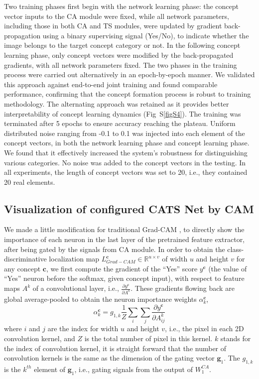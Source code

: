 \documentclass[pdflatex,sn-mathphys-num,lineno]{sn-jnl}%
\begin{document}
\begin{CJK}{UTF8}{gbsn}
Two training phases first begin with the network learning phase: the concept vector inputs to the CA module were fixed, while all network parameters, including those in both CA and TS modules, were updated by gradient back-propagation using a binary supervising signal (Yes/No), to indicate whether the image belongs to the target concept category or not. In the following concept learning phase, only concept vectors were modified by the back-propagated gradients, with all network parameters fixed. The two phases in the training process were carried out alternatively in an epoch-by-epoch manner. We validated this approach against end-to-end joint training and found comparable performance, confirming that the concept formation process is robust to training methodology. The alternating approach was retained as it provides better interpretability of concept learning dynamics (Fig~S\ref{figS4}). The training was terminated after 5 epochs to ensure accuracy reaching the plateau. Uniform distributed noise ranging from -0.1 to 0.1 was injected into each element of the concept vectors, in both the network learning phase and concept learning phase. We found that it effectively increased the system’s robustness for distinguishing various categories. No noise was added to the concept vectors in the testing. In all experiments, the length of concept vectors was set to 20, i.e., they contained 20 real elements.

\subsection{Visualization of configured CATS Net by CAM}
We made a little modification for traditional Grad-CAM \cite{selvaraju_grad-cam_2017}, to directly show the importance of each neuron in the last layer of the pretrained feature extractor, after being gated by the signals from CA module. In order to obtain the class-discriminative localization map $L_{Grad-CAM}^{\mathbf{c}} \in \mathbb{R}^{u \times v}$ of width $u$ and height $v$ for any concept $\mathbf{c}$, we first compute the gradient of the “Yes” score $y^\mathbf{c}$ (the value of “Yes” neuron before the softmax, given concept input), with respect to feature maps $A^k$ of a convolutional layer, i.e., $\frac{\partial y^\mathbf{c}}{\partial A^k}$. These gradients flowing back are global average-pooled to obtain the neuron importance weights $\alpha_k^\mathbf{c}$,
$$\alpha_k^\mathbf{c} = g_{1, k} \frac{1}{Z} \sum_i \sum_j \frac{\partial y^\mathbf{c}}{\partial A^k_{ij}}$$
where $i$ and $j$ are the index for width $u$ and height $v$, i.e., the pixel in each 2D convolution kernel, and $Z$ is the total number of pixel in this kernel. $k$ stands for the index of convolution kernel, it is straight forward that the number of convolution kernels is the same as the dimension of the gating vector $\mathbf{g}_1$. The $g_{1, k}$ is the $k^{th}$ element of $\mathbf{g}_1$, i.e., gating signals from the output of $W_1^{CA}$. 


\end{CJK}
\end{document}
